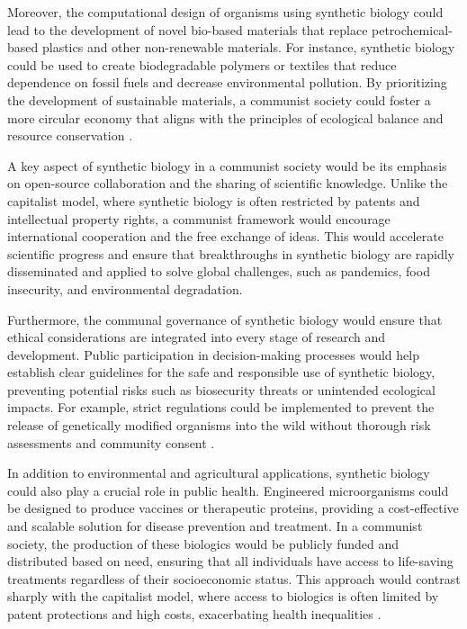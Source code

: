 Moreover, the computational design of organisms using synthetic biology could lead to the development of novel bio-based materials that replace petrochemical-based plastics and other non-renewable materials. For instance, synthetic biology could be used to create biodegradable polymers or textiles that reduce dependence on fossil fuels and decrease environmental pollution. By prioritizing the development of sustainable materials, a communist society could foster a more circular economy that aligns with the principles of ecological balance and resource conservation \cite[pp.~180-185]{diaz2018sustainability}.

A key aspect of synthetic biology in a communist society would be its emphasis on open-source collaboration and the sharing of scientific knowledge. Unlike the capitalist model, where synthetic biology is often restricted by patents and intellectual property rights, a communist framework would encourage international cooperation and the free exchange of ideas. This would accelerate scientific progress and ensure that breakthroughs in synthetic biology are rapidly disseminated and applied to solve global challenges, such as pandemics, food insecurity, and environmental degradation.

Furthermore, the communal governance of synthetic biology would ensure that ethical considerations are integrated into every stage of research and development. Public participation in decision-making processes would help establish clear guidelines for the safe and responsible use of synthetic biology, preventing potential risks such as biosecurity threats or unintended ecological impacts. For example, strict regulations could be implemented to prevent the release of genetically modified organisms into the wild without thorough risk assessments and community consent \cite[pp.~400-405]{rogers2018neurotechnology}.

In addition to environmental and agricultural applications, synthetic biology could also play a crucial role in public health. Engineered microorganisms could be designed to produce vaccines or therapeutic proteins, providing a cost-effective and scalable solution for disease prevention and treatment. In a communist society, the production of these biologics would be publicly funded and distributed based on need, ensuring that all individuals have access to life-saving treatments regardless of their socioeconomic status. This approach would contrast sharply with the capitalist model, where access to biologics is often limited by patent protections and high costs, exacerbating health inequalities \cite[pp.~500-505]{brown2022solidarity}.

